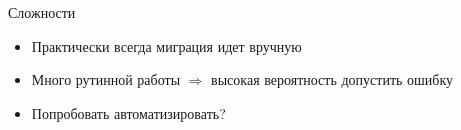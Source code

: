 \documentclass[12pt]{beamer}
\begin{document}
{
\begin{frame}{Сложности}
\begin{mybox}[]
\begin{itemize}
	\item Практически всегда миграция идет вручную
	\item Много рутинной работы $\Longrightarrow$ высокая вероятность допустить ошибку
	\item Попробовать автоматизировать?
\end{itemize}
\end{mybox}
\end{frame}
}
\end{document}
